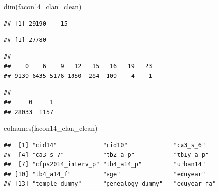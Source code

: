 \documentclass[
  oneside]{book}
\newenvironment{Shaded}{\begin{snugshade}}{\end{snugshade}}
\newcommand{\FunctionTok}[1]{\textcolor[rgb]{0.00,0.00,0.00}{#1}}
\newcommand{\NormalTok}[1]{#1}
\newcommand{\SpecialCharTok}[1]{\textcolor[rgb]{0.00,0.00,0.00}{#1}}
\begin{document}
\begin{Shaded}
\begin{Highlighting}[]
\FunctionTok{dim}\NormalTok{(facon14\_clan\_clean)}
\end{Highlighting}
\end{Shaded}

\begin{verbatim}
## [1] 29190    15
\end{verbatim}

\begin{Shaded}
\end{Shaded}

\begin{verbatim}
## [1] 27780
\end{verbatim}

\begin{Shaded}
\end{Shaded}

\begin{verbatim}
## 
##    0    6    9   12   15   16   19   23 
## 9139 6435 5176 1850  284  109    4    1
\end{verbatim}

\begin{Shaded}
\end{Shaded}

\begin{verbatim}
## 
##     0     1 
## 28033  1157
\end{verbatim}

\begin{Shaded}
\begin{Highlighting}[]
\FunctionTok{colnames}\NormalTok{(facon14\_clan\_clean)}
\end{Highlighting}
\end{Shaded}

\begin{verbatim}
##  [1] "cid14"             "cid10"             "ca3_s_6"          
##  [4] "ca3_s_7"           "tb2_a_p"           "tb1y_a_p"         
##  [7] "cfps2014_interv_p" "tb4_a14_p"         "urban14"          
## [10] "tb4_a14_f"         "age"               "eduyear"          
## [13] "temple_dummy"      "genealogy_dummy"   "eduyear_fa"
\end{verbatim}
\end{document}
